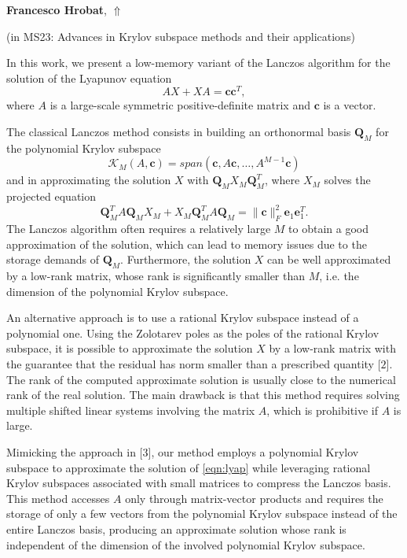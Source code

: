 \documentclass[ILAS2025-program.tex]{subfiles}
\begin{document}
\hypertarget{down0238}{}\begin{ilasabstract}
    
\textbf{Francesco Hrobat},  \hfill \hyperlink{up0238}{$\Uparrow$}
    
    
(in {\color{mstitle}MS23: Advances in Krylov subspace methods and their applications})
        
\mtskip
    In this work, we present a low-memory variant of the Lanczos algorithm for the solution of the Lyapunov equation
\begin{equation}\label{eqn:lyap}
AX + XA = \boldsymbol{c}\boldsymbol{c}^T,    
\end{equation}
where $A$ is a large-scale symmetric positive-definite matrix and $\boldsymbol{c}$ is a vector. 

The classical Lanczos method consists in building an orthonormal basis $\mathbf{Q}_M$ for the polynomial Krylov subspace
\[ \mathcal{K}_M(A,\boldsymbol{c}) = span(\boldsymbol{c},A\boldsymbol{c}, \dots, A^{M-1}\boldsymbol{c}) \]
and in approximating the solution $X$ with $\mathbf{Q}_MX_M\mathbf{Q}_M^T$, where $X_M$ solves the projected equation
\[ \mathbf{Q}_M^TA\mathbf{Q}_M X_M + X_M\mathbf{Q}_M^TA\mathbf{Q}_M = \| \boldsymbol{c} \|_F^2\boldsymbol{e}_1\boldsymbol{e}_1^T.\]
The Lanczos algorithm often requires a relatively large $M$ to obtain a good approximation of the solution, which can lead to memory issues due to the storage demands of $\mathbf{Q}_M$. Furthermore, the solution $X$ can be well approximated by a low-rank matrix, whose rank is significantly smaller than $M$, i.e. the dimension of the polynomial Krylov subspace. 

An alternative approach is to use a rational Krylov subspace instead of a polynomial one. Using the Zolotarev poles as the poles of the rational Krylov subspace, it is possible to approximate the solution $X$ by a low-rank matrix with the guarantee that the residual has norm smaller than a prescribed quantity [$2$]. The rank of the computed approximate solution is usually close to the numerical rank of the real solution. The main drawback is that this method requires solving multiple shifted linear systems involving the matrix $A$, which is prohibitive if $A$ is large. 

Mimicking the approach in [$3$], our method employs a polynomial Krylov subspace to approximate the solution of \eqref{eqn:lyap} while leveraging rational Krylov subspaces associated with small matrices to compress the Lanczos basis. This method accesses $A$ only through matrix-vector products and requires the storage of only a few vectors from the polynomial Krylov subspace instead of the entire Lanczos basis, producing an approximate solution whose rank is independent of the dimension of the involved polynomial Krylov subspace.


\end{ilasabstract}
\end{document}

